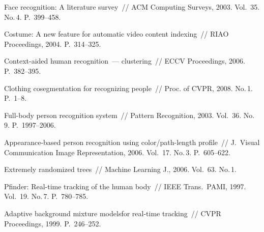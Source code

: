 \begin{multicols}{2}
{\small\frenchspacing
{%
\begin{thebibliography}{9}

Face recognition: A literature survey~// ACM Computing Surveys, 2003. 
Vol.~35. No.\,4. P.~399--458.

Costume: A new feature for automatic video content indexing~// RIAO Proceedings, 2004. P.~314--325. 

Context-aided human recognition~--- clustering~// ECCV Proceedings, 2006. P.~382--395. 

Clothing cosegmentation for recognizing people~// Proc. of CVPR, 2008. No.\,1. P.~1--8. 

Full-body person recognition system~// Pattern Recognition, 2003.
Vol.~36. No.\,9. P.~1997--2006.

Appearance-based person recognition using color/path-length profile~// J.~Visual Communication Image Representation, 2006.
Vol.~17. No.\,3. P.~605--622.

Extremely randomized trees~// Machine Learning J., 2006. Vol.~63. No.\,1.

Pfinder: Real-time tracking of the human body~// IEEE Trans.\ PAMI, 1997. Vol.~19. No.\,7. 
P.~780--785. 


\label{end\stat}

Adaptive background mixture modelsfor real-time tracking~// CVPR Proceedings, 1999. P.~246--252. 



 \end{thebibliography}
}
}
\end{multicols}